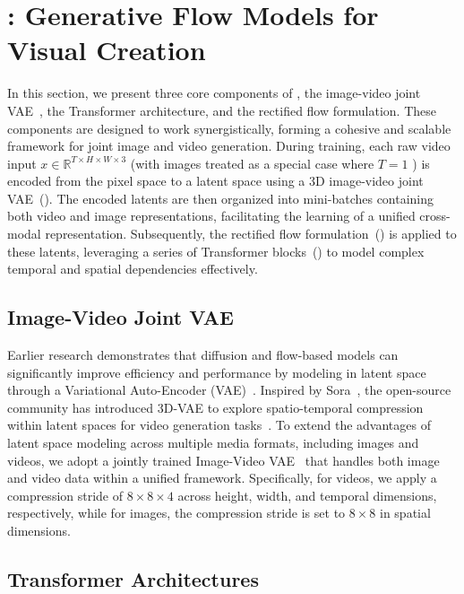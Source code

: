 \section{\ours: Generative Flow Models for Visual Creation}

In this section, we present three core components of \ours, the image-video joint VAE~\citep{yang2024cogvideox}, the \ours Transformer architecture, and the rectified flow formulation. These components are designed to work synergistically, forming a cohesive and scalable framework for joint image and video generation. During training, each raw video input $x\in \mathbb{R}^{T\times H \times W \times3}$ (with images treated as a special case where $T=1$ ) is encoded from the pixel space to a latent space using a 3D image-video joint VAE~(). The encoded latents are then organized into mini-batches containing both video and image representations, facilitating the learning of a unified cross-modal representation. Subsequently, the rectified flow formulation~() is applied to these latents, leveraging a series of Transformer blocks~() to model complex temporal and spatial dependencies effectively.

 
\subsection{Image-Video Joint VAE}\label{sec:vae}
Earlier research \citep{he2022latent,rombach2022high,esser2021taming} demonstrates that diffusion and flow-based models can significantly improve efficiency and performance by modeling in latent space through a Variational Auto-Encoder (VAE)~\citep{esser2021taming, kingma2013auto}. Inspired by Sora~\citep{videoworldsimulators2024}, the open-source community has introduced 3D-VAE to explore spatio-temporal compression within latent spaces for video generation tasks~\citep{pku_yuan_lab_and_tuzhan_ai_etc_2024_10948109, opensora, yang2024cogvideox}. To extend the advantages of latent space modeling across multiple media formats, including images and videos, we adopt a jointly trained Image-Video VAE~\citep{yang2024cogvideox} that handles both image and video data within a unified framework. Specifically, for videos, we apply a compression stride of $8 \times 8 \times 4$ across height, width, and temporal dimensions, respectively, while for images, the compression stride is set to $8 \times 8$ in spatial dimensions.



\subsection{Transformer Architectures}\label{sec:trans-block}

